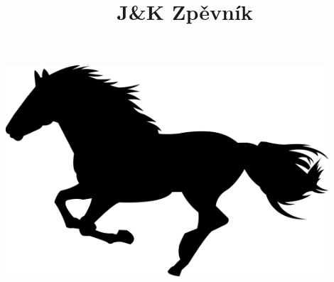 \documentclass[11pt]{article}
\title{\Huge{J\&K Zpěvník}}
\author{\sc{Jakub Komárek \& Jiří Blaha}}
\date{}
\begin{document}
	\maketitle
	\thispagestyle{empty}
	\includegraphics[width=0.9\textwidth]{cover}
	\newpage
	

	\begin{songs}%
	
	\end{songs}

\end{document}
